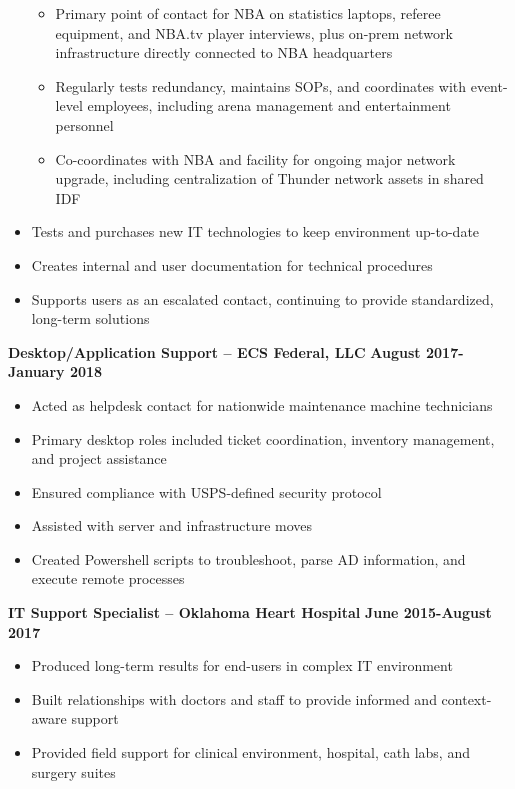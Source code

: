 \documentclass[line]{res}
\begin{document}
\begin{resume}
\begin{itemize}
\begin{itemize}
				\item Primary point of contact for NBA on statistics laptops, referee equipment, and NBA.tv player interviews, plus on-prem network infrastructure directly connected to NBA headquarters 
				\item Regularly tests redundancy, maintains SOPs, and coordinates with event-level employees, including arena management and entertainment personnel
				\item Co-coordinates with NBA and facility for ongoing major network upgrade, including centralization of Thunder network assets in shared IDF 
			\end{itemize}
		\item Tests and purchases new IT technologies to keep environment up-to-date
		\item Creates internal and user documentation for technical procedures 
		\item Supports users as an escalated contact, continuing to provide standardized, long-term solutions
	\end{itemize}
\textbf{Desktop/Application Support -- ECS Federal, LLC}
\newline
\textbf{August 2017-January 2018}
	\begin{itemize}
		\item Acted as helpdesk contact for nationwide maintenance machine technicians
		\item Primary desktop roles included ticket coordination, inventory management, and project assistance
		\item Ensured compliance with USPS-defined security protocol
		\item Assisted with server and infrastructure moves
		\item Created Powershell scripts to troubleshoot, parse AD information, and execute remote processes
	\end{itemize}
\textbf{IT Support Specialist -- Oklahoma Heart Hospital}
\newline
\textbf{June 2015-August 2017}
	\begin{itemize}
		\item Produced long-term results for end-users in complex IT environment
		\item Built relationships with doctors and staff to provide informed and context-aware support
		\item Provided field support for clinical environment, hospital, cath labs, and surgery suites
			\begin{itemize}

\end{itemize}
\end{itemize}
\end{resume}
\end{document}
